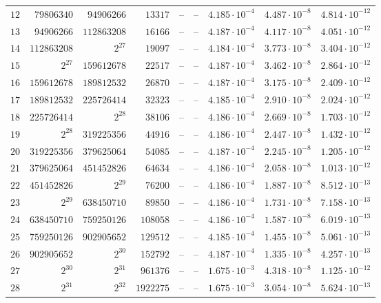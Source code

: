{\begin{longtable}{@{}rrrrrrrrr@{}}
$12$ & $79806340$ & $94906266$ & $13317$ & -- & -- & $4.185\cdot10^{-4}$ & $4.487\cdot10^{-8}$ & $4.814\cdot10^{-12}$\\
$13$ & $94906266$ & $112863208$ & $16166$ & -- & -- & $4.187\cdot10^{-4}$ & $4.117\cdot10^{-8}$ & $4.051\cdot10^{-12}$\\
$14$ & $112863208$ & $2^{27}$ & $19097$ & -- & -- & $4.184\cdot10^{-4}$ & $3.773\cdot10^{-8}$ & $3.404\cdot10^{-12}$\\
$15$ & $2^{27}$ & $159612678$ & $22517$ & -- & -- & $4.187\cdot10^{-4}$ & $3.462\cdot10^{-8}$ & $2.864\cdot10^{-12}$\\
$16$ & $159612678$ & $189812532$ & $26870$ & -- & -- & $4.187\cdot10^{-4}$ & $3.175\cdot10^{-8}$ & $2.409\cdot10^{-12}$\\
$17$ & $189812532$ & $225726414$ & $32323$ & -- & -- & $4.185\cdot10^{-4}$ & $2.910\cdot10^{-8}$ & $2.024\cdot10^{-12}$\\
$18$ & $225726414$ & $2^{28}$ & $38106$ & -- & -- & $4.186\cdot10^{-4}$ & $2.669\cdot10^{-8}$ & $1.703\cdot10^{-12}$\\
$19$ & $2^{28}$ & $319225356$ & $44916$ & -- & -- & $4.186\cdot10^{-4}$ & $2.447\cdot10^{-8}$ & $1.432\cdot10^{-12}$\\
$20$ & $319225356$ & $379625064$ & $54085$ & -- & -- & $4.187\cdot10^{-4}$ & $2.245\cdot10^{-8}$ & $1.205\cdot10^{-12}$\\
$21$ & $379625064$ & $451452826$ & $64634$ & -- & -- & $4.186\cdot10^{-4}$ & $2.058\cdot10^{-8}$ & $1.013\cdot10^{-12}$\\
$22$ & $451452826$ & $2^{29}$ & $76200$ & -- & -- & $4.186\cdot10^{-4}$ & $1.887\cdot10^{-8}$ & $8.512\cdot10^{-13}$\\
$23$ & $2^{29}$ & $638450710$ & $89850$ & -- & -- & $4.186\cdot10^{-4}$ & $1.731\cdot10^{-8}$ & $7.158\cdot10^{-13}$\\
$24$ & $638450710$ & $759250126$ & $108058$ & -- & -- & $4.186\cdot10^{-4}$ & $1.587\cdot10^{-8}$ & $6.019\cdot10^{-13}$\\
$25$ & $759250126$ & $902905652$ & $129512$ & -- & -- & $4.185\cdot10^{-4}$ & $1.455\cdot10^{-8}$ & $5.061\cdot10^{-13}$\\
$26$ & $902905652$ & $2^{30}$ & $152792$ & -- & -- & $4.187\cdot10^{-4}$ & $1.335\cdot10^{-8}$ & $4.257\cdot10^{-13}$\\
$27$ & $2^{30}$ & $2^{31}$ & $961376$ & -- & -- & $1.675\cdot10^{-3}$ & $4.318\cdot10^{-8}$ & $1.125\cdot10^{-12}$\\
$28$ & $2^{31}$ & $2^{32}$ & $1922275$ & -- & -- & $1.675\cdot10^{-3}$ & $3.054\cdot10^{-8}$ & $5.624\cdot10^{-13}$\\

\end{longtable}}
